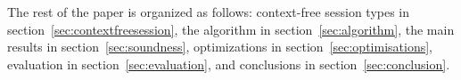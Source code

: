 
The rest of the paper is organized as follows: context-free session
types in section~\ref{sec:contextfreesession}, the algorithm in
section~\ref{sec:algorithm}, the main results in
section~\ref{sec:soundness}, optimizations in
section~\ref{sec:optimisations}, evaluation in
section~\ref{sec:evaluation}, and conclusions in
section~\ref{sec:conclusion}.



